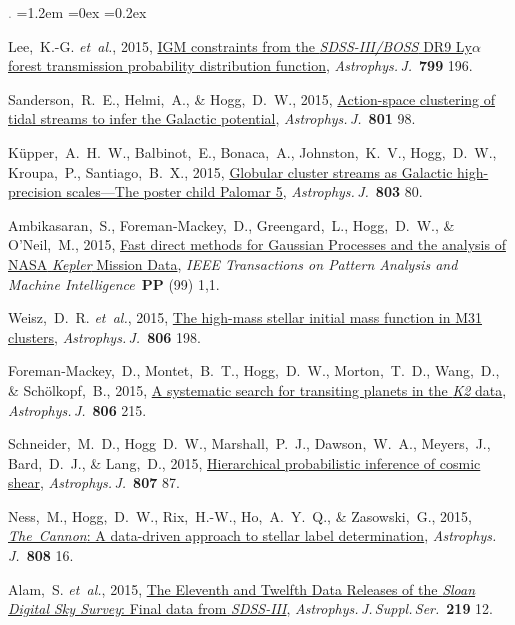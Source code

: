 \documentclass[10pt,letterpaper]{article}
\newcommand{\acronym}[1]{{\small{#1}}}
\newcommand{\foreign}[1]{\textsl{#1}}
\newcommand{\etal}{\foreign{et~al.}}
\newcommand{\project}[1]{\textsl{#1}}
\newcommand{\doi}[2]{\href{http://dx.doi.org/#1}{{#2}}}
\newcommand{\deemph}[1]{\textcolor{grey}{\footnotesize{#1}}}
\newcommand{\pubnumber}[1]{\deemph{{#1}.}}
\newcounter{refpubnum}
\newcommand{\hogglist}{%
    \rightmargin=0in
    \leftmargin=1.2em
    \topsep=0ex
    \partopsep=0pt
    \itemsep=0.2ex
    \parsep=0pt
    \itemindent=-1.0\leftmargin
    \listparindent=0.0\leftmargin
    \settowidth{\labelsep}{~}
    \usecounter{refpubnum}
  }
\begin{document}
\begin{list}{\pubnumber{\therefpubnum}}{\hogglist}
\item 
Lee,~K.-G. \etal, 2015,
\doi{10.1088/0004-637X/799/2/196}{IGM constraints from the \project{\acronym{SDSS-III/BOSS}}
DR9 Ly{$\alpha$} forest transmission probability distribution function},
\textit{Astrophys.\,J.}\ \textbf{799} 196.
\item
Sanderson,~R.~E., Helmi,~A., \& Hogg,~D.~W., 2015,
\doi{10.1088/0004-637X/801/2/98}{Action-space clustering of tidal streams
to infer the Galactic potential},
\textit{Astrophys.\,J.}\ \textbf{801} 98.
\item
K\"upper,~A.~H.~W., Balbinot,~E., Bonaca,~A., Johnston,~K.~V.,
Hogg,~D.~W., Kroupa,~P., Santiago,~B.~X., 2015,
\doi{10.1088/0004-637X/803/2/80}{Globular cluster streams as
Galactic high-precision scales---The poster child Palomar 5},
\textit{Astrophys.\,J.}\ \textbf{803} 80.
\item
Ambikasaran,~S., Foreman-Mackey,~D., Greengard,~L., Hogg,~D.~W., \& O'Neil,~M., 2015,
\doi{10.1109/TPAMI.2015.2448083}{Fast direct methods for Gaussian Processes and the analysis of \acronym{NASA} \project{Kepler} Mission Data},
\textit{IEEE Transactions on Pattern Analysis and Machine Intelligence}\ \textbf{PP} (99) 1,1.
\item
Weisz,~D.~R. \etal, 2015,
\doi{10.1088/0004-637X/806/2/198}{The high-mass stellar initial mass function in M31 clusters},
\textit{Astrophys.\,J.}\ \textbf{806} 198.
\item
Foreman-Mackey,~D., Montet,~B.~T., Hogg,~D.~W., Morton,~T.~D.,
Wang,~D., \& Sch\"olkopf,~B., 2015,
\doi{10.1088/0004-637X/806/2/215}{A systematic search for transiting planets in the \project{K2} data},
\textit{Astrophys.\,J.}\ \textbf{806} 215.
\item
Schneider,~M.~D., Hogg~D.~W., Marshall,~P.~J., Dawson,~W.~A., Meyers,~J.,
Bard,~D.~J., \& Lang,~D., 2015,
\doi{10.1088/0004-637X/807/1/87}{Hierarchical probabilistic inference of cosmic shear},
\textit{Astrophys.\,J.}\ \textbf{807} 87.
\item
Ness,~M., Hogg,~D.~W., Rix,~H.-W., Ho,~A.~Y.~Q., \& Zasowski,~G., 2015,
\doi{10.1088/0004-637X/808/1/16}{\project{The~Cannon}: A data-driven
approach to stellar label determination},
\textit{Astrophys.\,J.}\ \textbf{808} 16.
\item
Alam,~S. \etal, 2015,
\doi{10.1088/0067-0049/219/1/12}{The Eleventh and Twelfth Data Releases of the \project{Sloan Digital Sky Survey}: Final data from \project{\acronym{SDSS-III}}},
\textit{Astrophys.\,J.\,Suppl.\,Ser.}\ \textbf{219} 12.
\item

\end{list}
\end{document}
